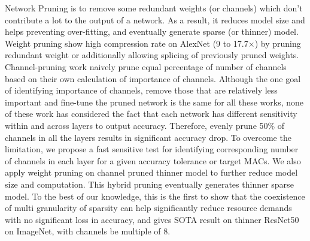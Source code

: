 \documentclass{article}
\begin{document}
Network Pruning is to remove some redundant weights (or channels) which don’t contribute a lot to the output of a network. As a result, it reduces model size and helps preventing over-fitting, and eventually generate sparse (or thinner) model. %
Weight pruning \cite{han2015learning}\cite{guo2016dynamic} show high compression rate on AlexNet (9 to 17.7$\times$) by pruning redundant weight or additionally allowing splicing of previously pruned weights. %
Channel-pruning work \cite{Li2016PruningFF}\cite{Molchanov2016PruningCN}\cite{luo2017thinet}\cite{He_2017_ICCV}\cite{Liu2017learning} naively prune equal percentage of number of channels based on their own calculation of importance of channels. Although the one goal of identifying importance of channels, remove those that are relatively less important and fine-tune the pruned network is the same for all these works, none of these work has considered the fact that each network has different sensitivity within and across layers to output accuracy. Therefore, evenly prune 50\% of channels in all the layers results in significant accuracy drop.  
To overcome the limitation, we propose a fast sensitive test for identifying corresponding number of channels in each layer for a given accuracy tolerance or target MACs. We also apply weight pruning on channel pruned thinner model to further reduce model size and computation. This hybrid pruning eventually generates thinner sparse model. To the best of our knowledge, this is the first to show that the coexistence of multi granularity of sparsity can help significantly reduce resource demands with no significant loss in accuracy, and gives SOTA result on thinner ResNet50 on ImageNet, with channels be multiple of 8. %

\end{document}
